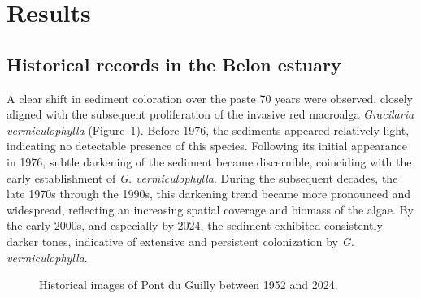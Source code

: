 \documentclass[
  letterpaper,
  DIV=11,
  numbers=noendperiod]{scrartcl}
\begin{document}
\section{Results}\label{results}

\subsection{Historical records in the Belon
estuary}\label{historical-records-in-the-belon-estuary}

A clear shift in sediment coloration over the paste 70 years were
observed, closely aligned with the subsequent proliferation of the
invasive red macroalga \emph{Gracilaria vermiculophylla}
(Figure~\ref{fig-HistoricalMap}). Before 1976, the sediments appeared
relatively light, indicating no detectable presence of this species.
Following its initial appearance in 1976, subtle darkening of the
sediment became discernible, coinciding with the early establishment of
\emph{G. vermiculophylla}. During the subsequent decades, the late 1970s
through the 1990s, this darkening trend became more pronounced and
widespread, reflecting an increasing spatial coverage and biomass of the
algae. By the early 2000s, and especially by 2024, the sediment
exhibited consistently darker tones, indicative of extensive and
persistent colonization by \emph{G. vermiculophylla}.

\label{cell-fig-HistoricalMap}
\begin{figure}[H]


\caption{\label{fig-HistoricalMap}Historical images of Pont du Guilly
between 1952 and 2024.}

\end{figure}%
\end{document}
